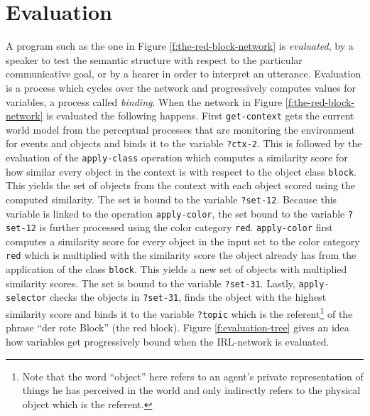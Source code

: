 \section{Evaluation}
A program such as the one in Figure \ref{f:the-red-block-network} is \emph{evaluated}, 
by a speaker to test the semantic structure with respect to the 
particular communicative goal, or by a hearer in order to interpret an utterance.
Evaluation is a process which cycles over the network and progressively computes values
for variables, a process called \emph{binding}.
When the network in Figure \ref{f:the-red-block-network}
is evaluated the following happens. First {\footnotesize\tt get-context} gets the current 
world model from the perceptual processes that are monitoring the 
environment for events and objects and binds it to the variable 
{\footnotesize\tt ?ctx-2}. This is followed by the evaluation of the {\footnotesize\tt apply-class}
operation which computes a similarity score for how similar every object
in the context is with respect to the object class {\footnotesize\tt block}. 
This yields the set of objects from the context with each object 
scored using the computed similarity. The set is bound to the variable {\footnotesize\tt ?set-12}. 
Because this variable is linked to the operation {\footnotesize\tt apply-color}, 
the set bound to the variable {\footnotesize\tt ?set-12} is further processed using the 
color category {\footnotesize\tt red}. {\footnotesize\tt apply-color} first computes
a similarity score for every object in the input set to the color category 
{\footnotesize\tt red} which is multiplied with the similarity score the object
already has from the application of the class {\footnotesize\tt block}.
This yields a new set of objects with multiplied similarity scores.
The set is bound to the variable {\footnotesize\tt ?set-31}. Lastly, {\footnotesize\tt apply-selector} 
checks the objects in {\footnotesize\tt ?set-31}, finds the object with 
the highest similarity score and binds it to the variable {\footnotesize\tt ?topic}
which is the referent\footnote{Note that the word ``object'' here refers 
to an agent's private representation of 
things he has perceived in the world and only 
indirectly refers to the physical object which is the referent.
} of the phrase ``der rote Block'' (the red block).
Figure \ref{f:evaluation-tree} gives an idea how variables get progressively 
bound when the IRL-network is evaluated.

